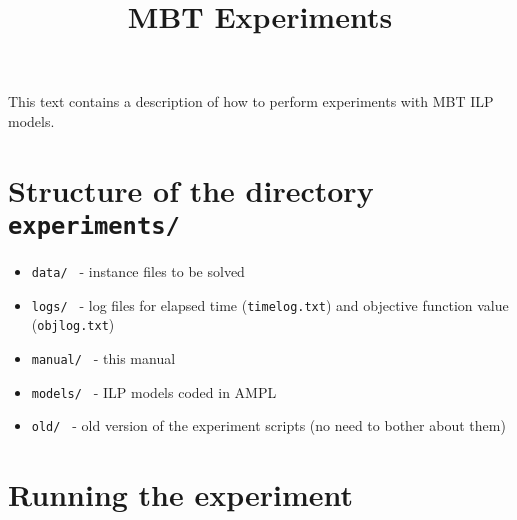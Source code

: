 \documentclass[12pt]{article}
\title{MBT Experiments}
\begin{document}
\maketitle
This text contains a description of how to perform experiments with MBT ILP models.

\section{Structure of the directory \texttt{experiments/}}
\begin{itemize}
	\item\texttt{data/ } - instance files to be solved
	\item\texttt{logs/ } - log files for elapsed time (\texttt{timelog.txt}) and objective function value (\texttt{objlog.txt})
	\item\texttt{manual/ } - this manual
	\item\texttt{models/ } - ILP models coded in AMPL
	\item\texttt{old/ } - old version of the experiment scripts (no need to bother about them)
\end{itemize}

\section{Running the experiment}
\end{document}

